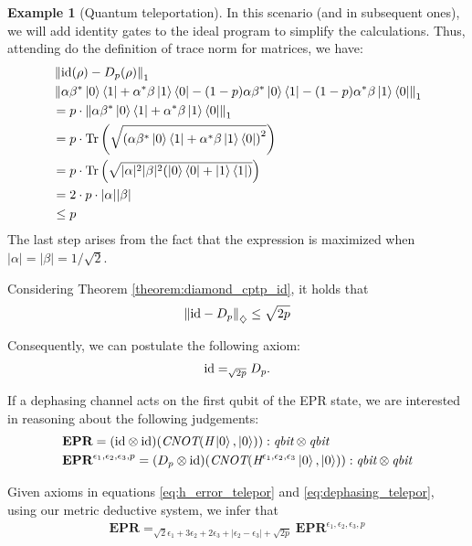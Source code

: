 \documentclass[10pt,a4paper]{amsart}
\theoremstyle{definition}
\theoremstyle{definition}
\newtheorem{example}[definition]{Example}
\theoremstyle{definition}
\theoremstyle{definition}
\theoremstyle{definition}
\theoremstyle{definition}
\begin{document}
\begin{example}[Quantum teleportation]
     In this scenario (and in subsequent ones), we will add identity gates to the ideal program to simplify the calculations. Thus, attending do the definition of trace norm for matrices, we have:
     \begin{align*}
      & \left\lVert  \mathrm{id}(\rho) - D_{p}(\rho) \right\rVert_{1} \\
      & \left\lVert  \alpha \beta^{*} \ket{0} \bra{1}+ \alpha^{*} \beta \ket{1} \bra{0}  -   (1-p) \alpha \beta^{*} \ket{0} \bra{1}-  (1-p) \alpha^{*}  \beta \ket{1} \bra{0}  \right\rVert_{1} \\
      & = p \cdot  \left\lVert  \alpha \beta^{*} \ket{0} \bra{1} + \alpha^{*}  \beta \ket{1} \bra{0}  \right\rVert_{1} \\
      & = p \cdot \text{Tr} \left(\sqrt{\left( \alpha \beta^{*} \ket{0} \bra{1} + \alpha^{*}  \beta \ket{1} \bra{0} \right)^2} \right) \\
      & = p \cdot  \text{Tr} \left(\sqrt{|\alpha|^{2}|\beta|^{2} (\ket{0} \bra{0}+ \ket{1} \bra{1})  } \right) \\
      & = 2 \cdot p \cdot |\alpha||\beta| \\
      & \leq p \\
     \end{align*}
     The last step arises from the fact that the expression is maximized when $|\alpha|=|\beta|=1/\sqrt{2}$.

     Considering Theorem \ref{theorem:diamond_cptp_id}, it holds that
     \begin{align*}
        \left\lVert  \mathrm{id} - D_p \right\rVert_{\diamondsuit} \leq \sqrt{2p}
     \end{align*}

     Consequently, we can postulate the following axiom:
      \begin{align} \label{eq:dephasing_telepor}
         \mathrm{id} =_{\sqrt{2p}}  D_p  .
      \end{align}

     If a dephasing channel acts on the first qubit of the EPR state, we are interested in reasoning about the following judgements:
     \begin{align*}
      &\textbf{EPR} = (\mathrm{id} \otimes \mathrm{id})(\emph{CNOT} (\emph{H}\ket{0},\ket{0})) : \emph{qbit} \otimes
      \emph{qbit}  \\ 
      &\textbf{EPR}^{\epsilon_1,\epsilon_2, \epsilon_3,p} =  (D_p \otimes \mathrm{id}) (\emph{CNOT} ( \emph{H}^{\epsilon_1,\epsilon_2, \epsilon_3}\ket{0},\ket{0})) : \emph{qbit} \otimes
      \emph{qbit} 
   \end{align*}

   Given axioms in equations \eqref{eq:h_error_telepor} and \eqref{eq:dephasing_telepor}, using our metric deductive system, we infer that
   \begin{align} \label{eq:epr_error_teleport}
    \textbf{EPR} =_{\sqrt{2}\epsilon_1 + 3 \epsilon_2 + 2\epsilon_3 + |\epsilon_2-\epsilon_3| + \sqrt{2p}} \textbf{EPR}^{\epsilon_1,\epsilon_2, \epsilon_3,p}
   \end{align}



\end{example}
\end{document}
